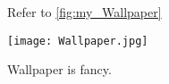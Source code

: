 \begin{figure}[ht] %

Refer to \autoref{fig:my_Wallpaper}

        \centering
        \texttt{[image: Wallpaper.jpg]}
        \caption{Wallpaper is fancy.}
        \label{fig:my_Wallpaper}
\end{figure}